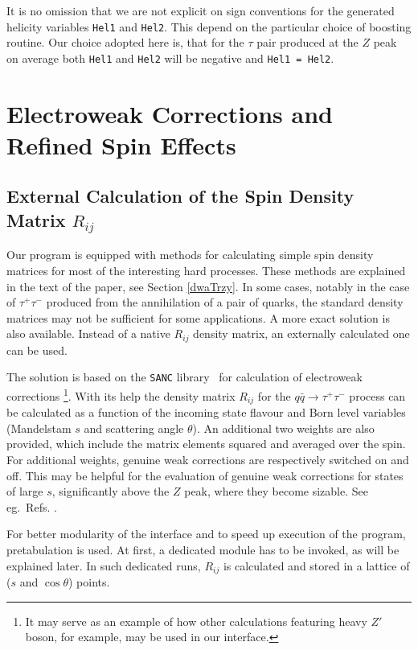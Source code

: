 \documentclass[]{Tauola_interface_design}
\begin{document}
It is no omission that we are not explicit on  sign conventions 
for the generated helicity variables {\tt Hel1} and {\tt Hel2}.
 This depend on the particular choice of boosting routine. 
Our  choice adopted here is, that for the $\tau$ pair produced at the $Z$ 
peak on average both {\tt Hel1} and {\tt Hel2} will be negative and 
 {\tt Hel1 = Hel2}. 

\section{Electroweak Corrections and Refined Spin Effects}
\label{Sect:electroweak}
\subsection{External Calculation of the Spin Density Matrix $R_{ij}$}

Our program is equipped with methods for calculating simple spin density matrices 
for most of the interesting hard processes. These methods are explained in the text of the paper, 
see Section \ref{dwaTrzy}. 
In some cases, notably in the case of $\tau^+ \tau^-$ produced from the annihilation of a pair of quarks,
the standard density matrices may not be sufficient for some applications. A more exact solution
is also available.  Instead of a native $R_{ij}$ density matrix, an externally calculated one can be used. 

The solution is based on the {\tt SANC} library~\cite{Andonov:2008ga,Andonov:2004hi} 
for calculation of electroweak corrections%
\footnote{It may serve as an example of how other 
calculations featuring heavy $Z'$ boson, for example, may be used in our interface.}.
With its help the density matrix $R_{ij}$ for the $q \bar q \to \tau^+ \tau^-$ process
can be calculated as a function of the incoming state flavour and Born level variables  (Mandelstam
$s$ and  scattering  angle $\theta$).
An additional two  weights are also provided, which include
 the matrix elements squared and averaged over the spin. 
For additional weights, genuine weak corrections are respectively switched on and off.
This may be helpful for the evaluation of genuine weak corrections for states
of large $s$, significantly above the $Z$ peak, where they become sizable.
See eg.~Refs. \cite{Adam:2008pc,Adam:2008ge}. 

For better modularity of the interface and to speed up execution of the program, pretabulation is used. 
At first, a dedicated module has to be invoked, as will be explained later. 
In such dedicated runs, $R_{ij}$ is calculated and stored in a lattice of 
 ($s$ and $\cos\theta$) points. 
 
\end{document}
